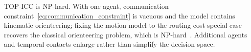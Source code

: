 TOP-ICC is NP-hard. With one agent, communication constraint~\eqref{eq:communication_constraint} is vacuous and the model contains kinematic orienteering; fixing the motion model to the routing-cost special case recovers the classical orienteering problem, which is NP-hard~\cite{golden1987orienteering,meyer2022kop}. Additional agents and temporal contacts enlarge rather than simplify the decision space.
